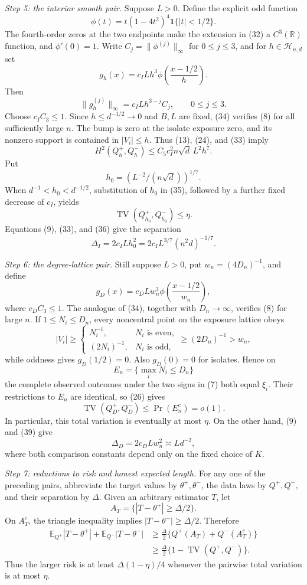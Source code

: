 \textit{Step 5: the interior smooth pair.}
Suppose \(L>0\).  Define the explicit odd function
\[
 \phi(t)=t(1-4t^2)^4\mathbf1\{|t|<1/2\}.
\tag{32}
\]
The fourth-order zeros at the two endpoints make the extension in (32) a \(C^3(\mathbb R)\) function, and \(\phi'(0)=1\).  Write \(C_j=\|\phi^{(j)}\|_\infty\) for \(0\leq j\leq3\), and for \(h\in\mathcal H_{n,d}\) set
\[
 g_h(x)=c_ILh^3\phi\!\left(\frac{x-1/2}{h}\right).
\tag{33}
\]
Then
\[
 \|g_h^{(j)}\|_\infty=c_ILh^{3-j}C_j,
 \qquad 0\leq j\leq3.
\tag{34}
\]
Choose \(c_I C_3\leq1\).  Since \(h\leq d^{-1/2}\to0\) and \(B,L\) are fixed, (34) verifies (8) for all sufficiently large \(n\).  The bump is zero at the isolate exposure zero, and its nonzero support is contained in \(|V_i|\leq h\).  Thus (13), (24), and (33) imply
\[
 H^2(Q_h^+,Q_h^-)
 \leq C_5c_I^2n\sqrt d\,L^2h^7.
\tag{35}
\]
Put
\[
 h_0=(L^{-2}/(n\sqrt d))^{1/7}.
\tag{36}
\]
When \(d^{-1}<h_0<d^{-1/2}\), substitution of \(h_0\) in (35), followed by a further fixed decrease of \(c_I\), yields
\[
 \operatorname{TV}(Q_{h_0}^+,Q_{h_0}^-)\leq\eta.
\tag{37}
\]
Equations (9), (33), and (36) give the separation
\[
 \Delta_I=2c_ILh_0^2
 =2c_IL^{3/7}(n^2d)^{-1/7}.
\tag{38}
\]

\textit{Step 6: the degree-lattice pair.}
Still suppose \(L>0\), put \(w_n=(4D_n)^{-1}\), and define
\[
 g_D(x)=c_DLw_n^3\phi\!\left(\frac{x-1/2}{w_n}\right),
\tag{39}
\]
where \(c_DC_3\leq1\).  The analogue of (34), together with \(D_n\to\infty\), verifies (8) for large \(n\).  If \(1\leq N_i\leq D_n\), every noncentral point on the exposure lattice obeys
\[
 |V_i|\geq
 \begin{cases}N_i^{-1},&N_i\text{ is even},\\(2N_i)^{-1},&N_i\text{ is odd},\end{cases}
 \geq(2D_n)^{-1}>w_n,
\tag{40}
\]
while oddness gives \(g_D(1/2)=0\).  Also \(g_D(0)=0\) for isolates.  Hence on
\[
 E_n=\{\max_iN_i\leq D_n\}
\]
the complete observed outcomes under the two signs in (7) both equal \(\xi_i\).  Their restrictions to \(E_n\) are identical, so (26) gives
\[
 \operatorname{TV}(Q_D^+,Q_D^-)
 \leq\Pr(E_n^c)=o(1).
\tag{41}
\]
In particular, this total variation is eventually at most \(\eta\).  On the other hand, (9) and (39) give
\[
 \Delta_D=2c_DLw_n^2\asymp Ld^{-2},
\tag{42}
\]
where both comparison constants depend only on the fixed choice of \(K\).

\textit{Step 7: reductions to risk and honest expected length.}
For any one of the preceding pairs, abbreviate the target values by \(\theta^+,\theta^-\), the data laws by \(Q^+,Q^-\), and their separation by \(\Delta\).  Given an arbitrary estimator \(T\), let
\[
 A_T=\{|T-\theta^+|\geq\Delta/2\}.
\]
On \(A_T^c\), the triangle inequality implies \(|T-\theta^-|\geq\Delta/2\).  Therefore
\[
 \begin{aligned}
 \mathbb E_{Q^+}|T-\theta^+|+\mathbb E_{Q^-}|T-\theta^-|
 &\geq\frac\Delta2\{Q^+(A_T)+Q^-(A_T^c)\}\\
 &\geq\frac\Delta2\{1-\operatorname{TV}(Q^+,Q^-)\}.
\end{aligned}
\tag{43}
\]
Thus the larger risk is at least \(\Delta(1-\eta)/4\) whenever the pairwise total variation is at most \(\eta\).

